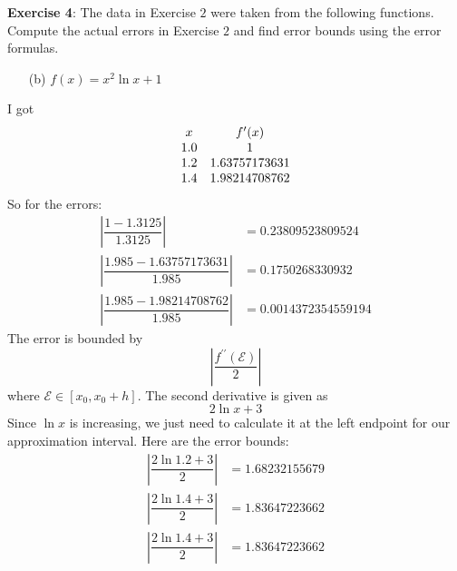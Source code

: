\documentclass{article}
\begin{document}
\textbf{Exercise 4}: The data in Exercise $2$ were taken from the following functions. Compute the actual errors in Exercise $2$ and find error bounds using the error formulas.
    \begin{itemize}
        \item [(b)] $f(x) = x^{2} \ln{x} + 1$
    \end{itemize}
    \begin{answer}
        I got
            \begin{align*}
                \begin{array}{ c c }
                    x   & f^{\prime}(x) \\
                    1.0 & 1             \\
                    1.2 & 1.63757173631 \\
                    1.4 & 1.98214708762   
                \end{array}
            \end{align*}
        So for the errors:
            \begin{align*}
                \left\lvert \dfrac{1 - 1.3125}{1.3125} \right\rvert           &= 0.23809523809524   \\
                \left\lvert \dfrac{1.985 - 1.63757173631}{1.985} \right\rvert &= 0.1750268330932    \\
                \left\lvert \dfrac{1.985 - 1.98214708762}{1.985} \right\rvert &= 0.0014372354559194   
            \end{align*}
        The error is bounded by
            \begin{equation*}
                \left\lvert \dfrac{f^{\prime\prime}(\mathcal{E})}{2} \right\rvert
            \end{equation*}
        where $\mathcal{E} \in [x_{0}, x_{0} + h]$. The second derivative is given as
            \begin{equation*}
                2\ln{x} + 3
            \end{equation*}
        Since $\ln{x}$ is increasing, we just need to calculate it at the left endpoint for our approximation interval. Here are the error bounds:
            \begin{align*}
                \left\lvert \dfrac{2\ln{1.2} + 3}{2} \right\rvert &= 1.68232155679 \\
                \left\lvert \dfrac{2\ln{1.4} + 3}{2} \right\rvert &= 1.83647223662 \\
                \left\lvert \dfrac{2\ln{1.4} + 3}{2} \right\rvert &= 1.83647223662   
            \end{align*}
    \end{answer}
\end{document}
